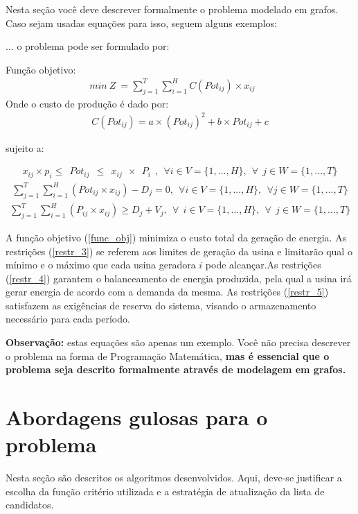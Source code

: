 \documentclass[12pt,fleqn]{article}
\begin{document}
 Nesta seção você deve descrever formalmente o problema modelado em grafos. Caso sejam usadas equações para isso, seguem alguns exemplos:

$\dots$ o problema  pode ser formulado por:

Função objetivo:
\begin{eqnarray}
min ~Z ~= \sum_{j=1}^{T} \sum_{i=1}^{H} C(Pot_{ij})\times x_{ij}   & & \label{func_obj}
\end{eqnarray}
Onde o custo de produção é dado por:
\begin{eqnarray}
C(Pot_{ij}) = a\times (Pot_{ij})^2+b\times Pot_{ij}+c
\end{eqnarray}

sujeito a:

\begin{eqnarray}
x_{ij} \times p_{i}  \leq ~~Pot_{ij} ~~\leq ~~ x_{ij} ~~\times ~~P_{i} ~~,  ~~\forall  i \in V=\{1,...,H\},~~\forall ~~ j\in W=\{1,...,T\} \label{restr_3}
\end{eqnarray}
\begin{eqnarray}
\sum_{j=1}^{T} \sum_{i=1}^{H} (Pot_{ij}\times x_{ij}) - D_{j} = 0 , ~~ \forall  i\in V=\{1,...,H\},~~\forall  j\in W=\{1,...,T\}  \label{restr_4}
\end{eqnarray}
\begin{eqnarray}
\sum_{j=1}^{T} \sum_{i=1}^{H} (P_{ij}\times x_{ij}) \geq D_{j}+V_{j} ,  ~~\forall ~~ i\in V=\{1,...,H\},~~\forall ~~ j\in W=\{1,...,T\}  \label{restr_5}
\end{eqnarray}


A função objetivo (\ref{func_obj})   minimiza o custo total da geração de energia.  As restrições (\ref{restr_3}) se referem aos limites de geração da usina e limitarão qual o mínimo e o máximo que cada usina geradora $i$ pode alcançar.As restrições (\ref{restr_4}) garantem o balanceamento de energia produzida, pela qual a usina irá gerar energia de acordo com a demanda da mesma. As restrições (\ref{restr_5}) satisfazem as exigências de reserva do sistema, visando o armazenamento necessário para cada período. 

\textbf{Observação:} estas equações são apenas um exemplo. Você não precisa descrever o problema na forma de Programação Matemática, \textbf{mas é essencial que o problema seja descrito formalmente através de  modelagem em grafos.}

\section{Abordagens gulosas para o problema}
\label{secAlgoritmos}
Nesta seção são descritos os algoritmos desenvolvidos. Aqui, deve-se justificar a escolha da função critério utilizada e a estratégia de atualização da lista de candidatos.
\end{document}
